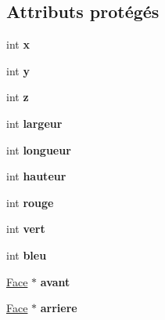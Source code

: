 \subsection*{Attributs protégés}
\begin{DoxyCompactItemize}
\item 
\hypertarget{classMembre_a04ac42e599f243f78272a3c8e49b9e03}{int {\bfseries x}}\label{classMembre_a04ac42e599f243f78272a3c8e49b9e03}

\item 
\hypertarget{classMembre_a6f973cc67e074d031ae2531716f9361c}{int {\bfseries y}}\label{classMembre_a6f973cc67e074d031ae2531716f9361c}

\item 
\hypertarget{classMembre_adf58c4769c5d0c6c9b4e9b7581d4699c}{int {\bfseries z}}\label{classMembre_adf58c4769c5d0c6c9b4e9b7581d4699c}

\item 
\hypertarget{classMembre_a12bc2f7c0e74d2db178eaa2d04b9272a}{int {\bfseries largeur}}\label{classMembre_a12bc2f7c0e74d2db178eaa2d04b9272a}

\item 
\hypertarget{classMembre_aafc42963d0eadaa4d14524fc4463467b}{int {\bfseries longueur}}\label{classMembre_aafc42963d0eadaa4d14524fc4463467b}

\item 
\hypertarget{classMembre_ac99d101f9c39188cf0ca09a5e927bdbc}{int {\bfseries hauteur}}\label{classMembre_ac99d101f9c39188cf0ca09a5e927bdbc}

\item 
\hypertarget{classMembre_a5bfecfe7ee9f81e5757cac9e53447d8f}{int {\bfseries rouge}}\label{classMembre_a5bfecfe7ee9f81e5757cac9e53447d8f}

\item 
\hypertarget{classMembre_a26e2eeeeec8d1650b7acec77d8810c03}{int {\bfseries vert}}\label{classMembre_a26e2eeeeec8d1650b7acec77d8810c03}

\item 
\hypertarget{classMembre_a197a326ca4da8ef107273b469ce6d998}{int {\bfseries bleu}}\label{classMembre_a197a326ca4da8ef107273b469ce6d998}

\item 
\hypertarget{classMembre_a2170d897e6d3f78145b6ab21c768f5b4}{\hyperlink{classFace}{Face} $\ast$ {\bfseries avant}}\label{classMembre_a2170d897e6d3f78145b6ab21c768f5b4}

\item 
\hypertarget{classMembre_af4a7bb9ec540828b81be7d884f6d5b0d}{\hyperlink{classFace}{Face} $\ast$ {\bfseries arriere}}\label{classMembre_af4a7bb9ec540828b81be7d884f6d5b0d}


\end{DoxyCompactItemize}
